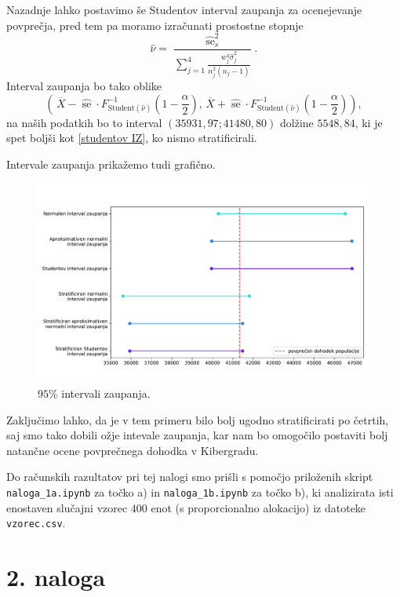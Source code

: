 \documentclass[a4paper,11pt]{article}
\newcommand{\olsi}[1]{\,\overline{\!{#1}}} %
\newcommand{\inv}{^{-1}}
\DeclareMathOperator{\se}{se}
\begin{document}
Nazadnje lahko postavimo še Studentov interval zaupanja za ocenejevanje povprečja, pred tem pa moramo izračunati prostostne stopnje
\[
    \hat{\nu} = \frac{\hat{\se}^2_s}{\sum_{j = 1}^4 \frac{w_j^4 \hat{\sigma}^2_j}{n_j^2 (n_j - 1)}}.  
\]
Interval zaupanja bo tako oblike
\[
    \left(\olsi{X} - \hat{\se} \cdot F_{\text{Student}(\hat{\nu})}\inv\left(1 - \frac{\alpha}{2}\right), 
    \olsi{X} + \hat{\se} \cdot F_{\text{Student}(\hat{\nu})}\inv\left(1 - \frac{\alpha}{2}\right)\right),  
\]
na naših podatkih bo to interval $\left(35931,97; 41480,80\right)$ dolžine $5548,84$, ki je spet boljši kot \eqref{studentov IZ}, ko nismo stratificirali.

Intervale zaupanja prikažemo tudi grafično.
\begin{figure}[h]
    \centering
    \includegraphics[width=\textwidth]{intervali_zaupanja.pdf}
    \caption{$95\%$ intervali zaupanja.}
\end{figure}

Zaključimo lahko, da je v tem primeru bilo bolj ugodno stratificirati po četrtih, saj smo tako dobili ožje intevale zaupanja, kar nam bo omogočilo postaviti bolj natančne ocene povprečnega dohodka v Kibergradu. 

Do računskih razultatov pri tej nalogi smo prišli s pomočjo priloženih skript \texttt{naloga\_1a.ipynb} za točko a) in \texttt{naloga\_1b.ipynb} za točko b), ki analizirata isti enostaven slučajni vzorec $400$ enot (s proporcionalno alokacijo) iz datoteke \texttt{vzorec.csv}.

\section*{2. naloga}
\end{document}
